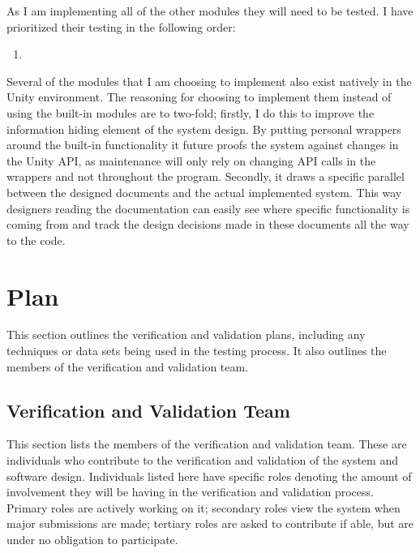 \documentclass[12pt, titlepage]{article}
\begin{document}
As I am implementing all of the other modules they will need to be tested. I 
have prioritized their testing in the following order:

\begin{enumerate}

	\item 
\end{enumerate}

Several of the modules that I am choosing to implement also exist natively in 
the Unity environment. The reasoning for choosing to implement them instead of 
using the built-in modules are to two-fold; firstly, I do this to improve the 
information hiding element of the system design. By putting personal wrappers 
around the built-in functionality it future proofs the system against changes 
in the Unity API, as maintenance will only rely on changing API calls in the 
wrappers and not throughout the program. Secondly, it draws a specific parallel 
between the designed documents and the actual implemented system. This way 
designers reading the documentation can easily see where specific functionality 
is coming from and track the design decisions made in these documents all the 
way to the code.

\section{Plan}
This section outlines the verification and validation plans, including any 
techniques or data sets being used in the testing process. It also outlines the 
members of the verification and validation team.

\subsection{Verification and Validation Team}
This section lists the members of the verification and validation team. These 
are individuals who contribute to the verification and validation of the system 
and software design. Individuals listed here have specific roles denoting the 
amount of involvement they will be having in the verification and validation 
process. Primary roles are actively working on it; secondary roles view the 
system when major submissions are made; tertiary roles are asked to contribute 
if able, but are under no obligation to participate.
\end{document}
